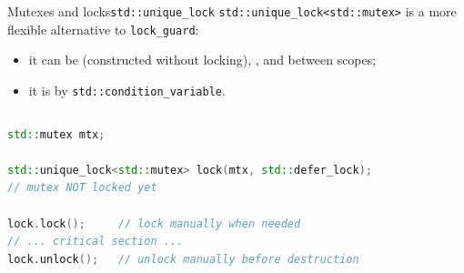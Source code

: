 \begin{frame}[fragile]{Mutexes and locks}{\texttt{std::unique\_lock}}
	\justifying
	\texttt{std::unique\_lock<std::mutex>} is a more flexible alternative to \texttt{lock\_guard}:
	\begin{itemize}
		\item it can be  (constructed without locking), , and  between scopes;
		\item it is  by \texttt{std::condition\_variable}.
	\end{itemize}
	\begin{columns}
		\begin{lstlisting}[style=codebeamer, language=C++, caption=\texttt{unique\_lock} with deferred locking.]
std::mutex mtx;

std::unique_lock<std::mutex> lock(mtx, std::defer_lock);
// mutex NOT locked yet

lock.lock();     // lock manually when needed
// ... critical section ...
lock.unlock();   // unlock manually before destruction
    \end{lstlisting}
	\end{columns}
\end{frame}
